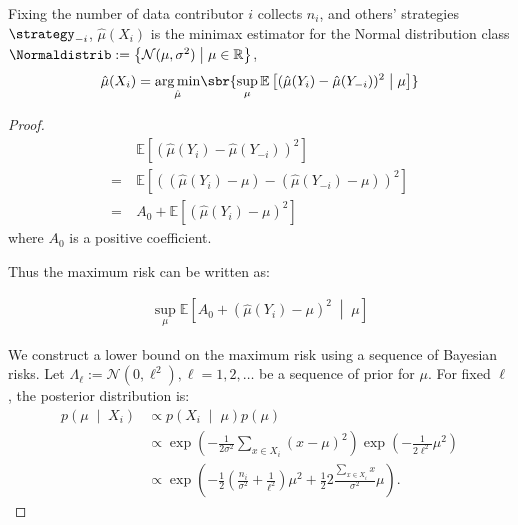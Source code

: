 
\begin{lemma}\label{Lemma:multi1} 
   Fixing the number of data contributor $i$ collects $n_i$, and others' strategies $\strategy_{-i}$, $\hat{\mu}\left(X_i\right)$ is the minimax estimator for the Normal distribution class $\Normaldistrib := \left\{\mathcal{N}(\mu,\sigma^2) \;\middle|\; \mu \in \mathbb{R}\right\}$,
    \begin{align*}
       \hat{\mu}(X_i)  = \underset{\hat{\mu}}{\arg\min} \sbr{\sup _\mu \mathbb{E}\left[(\hat{\mu}( Y_i)- \hat{\mu}( Y_{-i}) )^2 \;\middle|\;  \mu \right] }
    \end{align*} 
     
\end{lemma}


\begin{proof}

\begin{align*}
    & \ \mathbb{E}\left[ \left( \hat{\mu}\left( Y_i \right)-\hat{\mu}\left( Y_{-i} \right)  \right)^2 \right] \\ =  & \ \mathbb{E}\left[ \left( (\hat{\mu}\left(  Y_i \right)-\mu) -(\hat{\mu}\left(  Y_{-i} \right) -\mu) \right)^2   \right] \\ =  & \ A_0 + \mathbb{E}\left[ (\hat{\mu}\left(  Y_i \right)-\mu)^2  \right]
\end{align*}
where $A_0$ is a positive coefficient.

Thus the maximum risk can be written as:

\begin{align*}
    \sup _\mu \mathbb{E}\left[A_0 + \left(\hat{\mu}\left( Y_i\right)-\mu\right)^{2} \;\middle|\;  \mu \right]
\end{align*}


We construct a lower bound on the maximum risk using a sequence of Bayesian risks. Let $\Lambda_{\ell}:=\mathcal{N}\left(0, \ell^2\right), \ell=1,2, \ldots$ be a sequence of prior for $\mu$. For fixed $\ell$, the posterior distribution is:
$$
\begin{aligned}
p\left(\mu \;\middle|\;  X_i\right) & \propto p\left(X_i \;\middle|\;  \mu\right) p(\mu) \\ & \propto \exp \left(-\frac{1}{2 \sigma^2} \sum_{x \in X_i}(x-\mu)^2\right) \exp \left(-\frac{1}{2 \ell^2} \mu^2\right) \\
& \propto \exp \left(-\frac{1}{2}\left(\frac{n_i}{\sigma^2}+\frac{1}{\ell^2}\right) \mu^2+\frac{1}{2} 2 \frac{\sum_{x \in X_i} x}{\sigma^2} \mu\right) .
\end{aligned}
$$


\end{proof}
